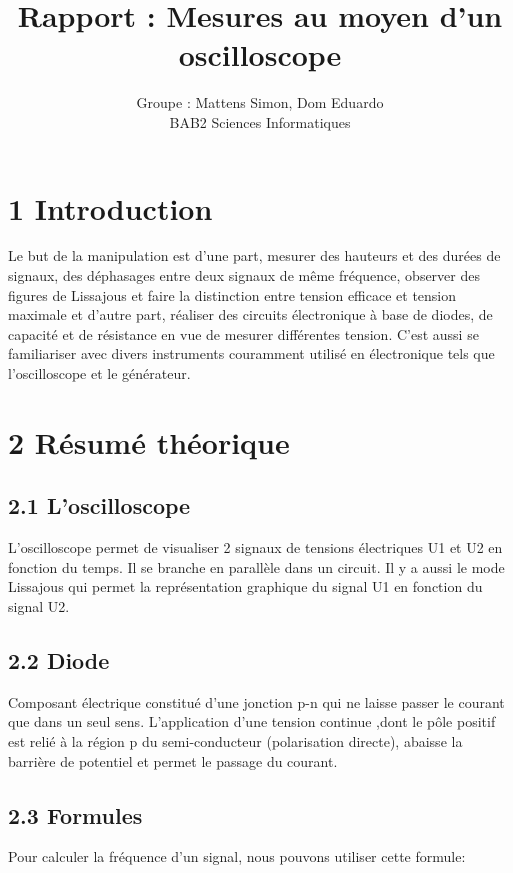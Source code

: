 \documentclass{report}
\author{Groupe : Mattens Simon, Dom Eduardo \\ BAB2 Sciences Informatiques}
\title{Rapport : Mesures au moyen d'un oscilloscope}
\makeatletter
\def\maketitle{%
  \null
  \thispagestyle{empty}%
  \vfill
  \begin{center}\leavevmode
    \normalfont
    {\LARGE \@title\par}%
    \vskip 1cm
    {\Large \@author\par}%
    \vskip 1cm
    {\Large \@date\par}%
  \end{center}%
  \vfill
  \null
  \newpage
  }
\makeatother
\begin{document}
\maketitle

\section*{1 Introduction}
\hspace*{0.5cm}
Le but de la manipulation est 
d'une part, mesurer des hauteurs et des dur\'ees de signaux, des d\'ephasages entre deux signaux de m\^eme fr\'equence, observer des figures de Lissajous et faire la distinction entre tension efficace et tension maximale et d'autre part, r\'ealiser des circuits \'electronique \`a base de diodes, de capacit\'e et de r\'esistance en vue de mesurer diff\'erentes tension. C'est aussi se familiariser avec divers instruments couramment utilis\'e en \'electronique tels que l'oscilloscope et le g\'en\'erateur.

\section*{2 R\'esum\'e th\'eorique}
\subsection*{2.1 L'oscilloscope}
\hspace*{0.5cm}
L'oscilloscope permet de visualiser 2 signaux de tensions \'electriques U1 et U2 en fonction du temps. Il se branche en parall\`ele dans un circuit. Il y a aussi le mode Lissajous qui permet la repr\'esentation graphique du signal U1 en fonction du signal U2.
\subsection*{2.2 Diode}
\hspace*{0.5cm}
Composant \'electrique constitu\'e d'une jonction p-n qui ne laisse passer le courant que dans un seul sens. L'application d'une tension continue ,dont le p\^ole positif est reli\'e \`a la r\'egion p du semi-conducteur (polarisation directe), abaisse la barri\`ere de potentiel et permet le passage du courant.
\subsection*{2.3 Formules}
\hspace*{0.5cm}
Pour calculer la fr\'equence d'un signal, nous pouvons utiliser cette formule:
\end{document}
